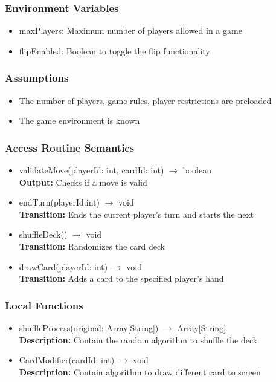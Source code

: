 \documentclass[12pt, titlepage]{article}
\begin{document}
\subsubsection{Environment Variables}
\begin{itemize}
\item maxPlayers: Maximum number of players allowed in a game
\item flipEnabled: Boolean to toggle the flip functionality
\end{itemize}

\subsubsection{Assumptions}
\begin{itemize}
\item The number of players, game rules, player restrictions are preloaded
\item The game environment is known
\end{itemize}

\subsubsection{Access Routine Semantics}

\begin{itemize}
\item validateMove(playerId: int, cardId: int) $\rightarrow$ boolean\\
\textbf{Output:} Checks if a move is valid

\item endTurn(playerId:int) $\rightarrow$ void\\
\textbf{Transition:} Ends the current player's turn and starts the next

\item shuffleDeck() $\rightarrow$ void\\
\textbf{Transition:} Randomizes the card deck

\item drawCard(playerId: int) $\rightarrow$ void\\
\textbf{Transition:} Adds a card to the specified player’s hand

\end{itemize}


\subsubsection{Local Functions}
\begin{itemize}
\item shuffleProcess(original: Array[String]) $\rightarrow$ Array[String]\\
\textbf{Description:} Contain the random algorithm to shuffle the deck
\item CardModifier(cardId: int) $\rightarrow$ void\\
\textbf{Description:} Contain algorithm to draw different card to screen
\end{itemize}
\end{document}
